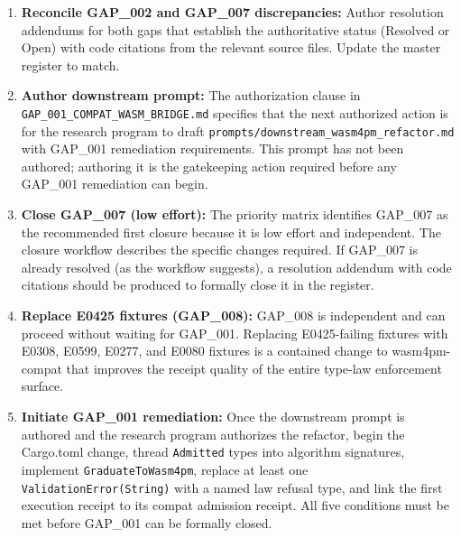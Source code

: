 \begin{enumerate}
  \item \textbf{Reconcile GAP\_002 and GAP\_007 discrepancies:} Author resolution
        addendums for both gaps that establish the authoritative status (Resolved or
        Open) with code citations from the relevant source files. Update the master
        register to match.

  \item \textbf{Author downstream prompt:} The authorization clause in
        \texttt{GAP\_001\_COMPAT\_WASM\_BRIDGE.md} specifies that the next authorized
        action is for the research program to draft
        \texttt{prompts/downstream\_wasm4pm\_refactor.md} with GAP\_001 remediation
        requirements. This prompt has not been authored; authoring it is the gatekeeping
        action required before any GAP\_001 remediation can begin.

  \item \textbf{Close GAP\_007 (low effort):} The priority matrix identifies GAP\_007
        as the recommended first closure because it is low effort and independent. The
        closure workflow describes the specific changes required. If GAP\_007 is already
        resolved (as the workflow suggests), a resolution addendum with code citations
        should be produced to formally close it in the register.

  \item \textbf{Replace E0425 fixtures (GAP\_008):} GAP\_008 is independent and can
        proceed without waiting for GAP\_001. Replacing E0425-failing fixtures with
        E0308, E0599, E0277, and E0080 fixtures is a contained change to wasm4pm-compat
        that improves the receipt quality of the entire type-law enforcement surface.

  \item \textbf{Initiate GAP\_001 remediation:} Once the downstream prompt is authored
        and the research program authorizes the refactor, begin the Cargo.toml change,
        thread \texttt{Admitted} types into algorithm signatures, implement
        \texttt{GraduateToWasm4pm}, replace at least one \texttt{ValidationError(String)}
        with a named law refusal type, and link the first execution receipt to its
        compat admission receipt. All five conditions must be met before GAP\_001 can be
        formally closed.
\end{enumerate}
